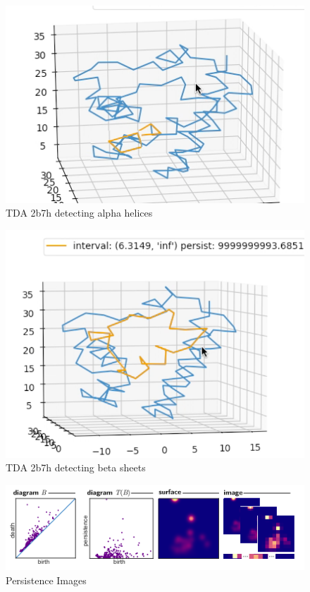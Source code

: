 \documentclass[12pt, a4paper, twocolumn, fullpage]{article}
\theoremstyle{plain}
\theoremstyle{definition}
\theoremstyle{remark}
\begin{document}
\begin{figure}[t]
	\includegraphics[width=\linewidth]{helixsimplex.png}
	\caption{TDA 2b7h detecting alpha helices }
	\label{fig:tdahelix}
\end{figure}

\begin{figure}[t]
	\includegraphics[width=\linewidth]{betasimplex.png}
	\caption{TDA 2b7h detecting beta sheets }
	\label{fig:tdabeta}
\end{figure}


\begin{figure}
	\includegraphics[width=\linewidth]{persistenceimages.png}
	\caption{Persistence Images}
	\label{fig:boat1}
\end{figure}
\end{document}
